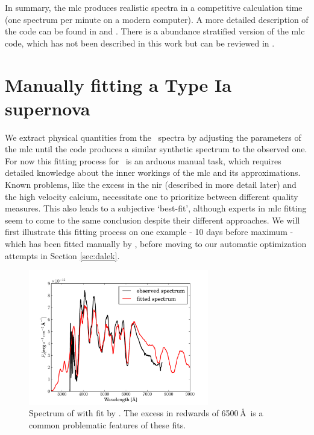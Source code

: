In summary, the \gls{mlc} produces realistic spectra in a competitive calculation time (one spectrum per minute on a modern computer). A more detailed description of the code can be found in  \citet{1993A&A...279..447M} and \citet{2000A&A...363..705M}. There is a abundance stratified version of the \gls{mlc} code, which has not been described in this work but can be reviewed in \citet{2005MNRAS.360.1231S}.


\section{Manually fitting a Type Ia supernova}
\label{sec:manual_sneia}

We extract physical quantities from the \snia\ spectra by adjusting the parameters of the \gls{mlc} until the code produces a similar synthetic spectrum to the observed one. For now this fitting process for \sneia\ is an arduous manual task, which requires detailed knowledge about the inner workings of the \gls{mlc} and its approximations. Known problems, like the excess in the \gls{nir} (described in more detail later) and the high velocity calcium, necessitate one to prioritize between different quality measures. This also leads to a subjective `best-fit', although experts in \gls{mlc} fitting seem to come to the same conclusion despite their different approaches. We will first illustrate this fitting process on one example -  10 days before maximum \citep{2004MNRAS.348..261B} - which has been fitted manually by \citet[][]{hachinger_dipl2007}, before moving to our automatic optimization attempts in Section \ref{sec:dalek}. 
\begin{figure}[htbp] %
   \centering
   \includegraphics[width=0.7\textwidth]{chapter_dalek/plots/bf2002bo-10.pdf} 
   \caption[Spectrum on SN 2002bo with MLMC fit]{Spectrum of  \citep{2004MNRAS.348..261B} with  fit by \citet{hachinger_dipl2007}. The excess in redwards of 6500\,\AA\ is a common problematic features of these fits.}
   \label{fig:sn2002bo-10_bf}
\end{figure}


